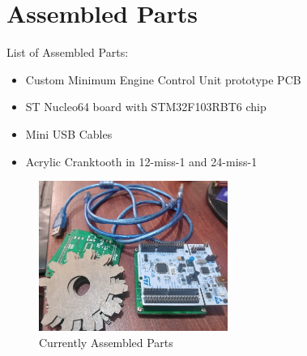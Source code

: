 \documentclass[a4paper,12pt,oneside,pdflatex,italian,final,twocolumn]{article}
\begin{document}
	\raggedright
	\section{Assembled Parts}
	
	List of Assembled Parts:
	\begin{itemize}
		\item Custom Minimum Engine Control Unit prototype PCB
		
		\item ST Nucleo64 board with STM32F103RBT6 chip
		
		\item Mini USB Cables
		
		\item Acrylic Cranktooth in 12-miss-1 and 24-miss-1
	\end{itemize}

	\begin{figure} [h]
		\centering
		\includegraphics[width=0.55\textwidth,]{images/parts.jpg}
		\caption{Currently Assembled Parts}
	\end{figure}
\end{document}
